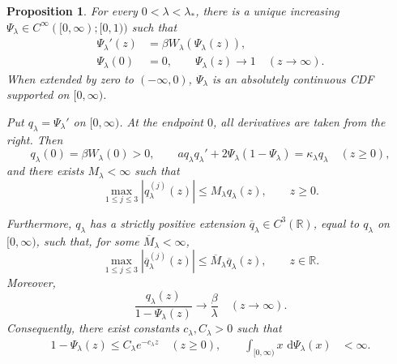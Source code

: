 \documentclass[12pt]{amsart}
\numberwithin{equation}{section}
\theoremstyle{plain}
\newtheorem{proposition}[theorem]{Proposition}
\theoremstyle{definition}
\newcommand{\dd}{\,\mathrm d}
\begin{document}
\begin{proposition}
\label{prop:hard-edge-distribution}
For every $0<\lambda<\lambda_*$, there is a unique increasing
$\Psi_\lambda\in C^\infty([0,\infty);[0,1))$ such that
\begin{equation}
\begin{aligned}
 \Psi_\lambda'(z)&=\beta W_\lambda(\Psi_\lambda(z)),\\
 \Psi_\lambda(0)&=0,\qquad
 \Psi_\lambda(z)\longrightarrow1
 \quad(z\to\infty).
\end{aligned}
 \label{eq:Psi-subcritical-definition}
\end{equation}
When extended by zero to $(-\infty,0)$, $\Psi_{\lambda}$ is an absolutely continuous CDF supported on
$[0,\infty)$.

Put $q_\lambda=\Psi_\lambda'$ on $[0,\infty)$. At the endpoint $0$,
all derivatives are taken from the right.  Then
\begin{equation}
 q_\lambda(0)=\beta W_\lambda(0)>0,
 \qquad
 a q_\lambda q_\lambda'
 +2\Psi_\lambda(1-\Psi_\lambda)
 =\kappa_\lambda q_\lambda
 \quad(z\ge0),
 \label{eq:lower-profile-equation}
\end{equation}
and there exists $M_\lambda<\infty$ such that
\begin{equation}
 \max_{1\le j\le3}|q_\lambda^{(j)}(z)|
 \le M_\lambda q_\lambda(z),
 \qquad z\ge0.
 \label{eq:subcritical-relative-bounds}
\end{equation}

Furthermore, $q_\lambda$ has a strictly positive extension
$\overline q_\lambda\in C^3(\mathbb R)$, equal to $q_\lambda$ on
$[0,\infty)$, such that, for some $\overline M_\lambda<\infty$,
\begin{equation}
 \max_{1\le j\le3}|\overline q_\lambda^{(j)}(z)|
 \le \overline M_\lambda\overline q_\lambda(z),
 \qquad z\in\mathbb R.
 \label{eq:q-extension-bounds}
\end{equation}
Moreover,
\begin{equation}
 \frac{q_\lambda(z)}{1-\Psi_\lambda(z)}
 \longrightarrow\frac\beta\lambda
 \quad(z\to\infty).
 \label{eq:subcritical-right-tail}
\end{equation}
Consequently, there exist constants $c_\lambda,C_\lambda>0$ such that
\[
\begin{aligned}
 1-\Psi_\lambda(z)\le C_\lambda e^{-c_\lambda z}
 \quad(z\ge0),\qquad
 \int_{[0,\infty)}x\,\dd\Psi_\lambda(x)&<\infty.
\end{aligned}
\]

\end{proposition}
\end{document}
